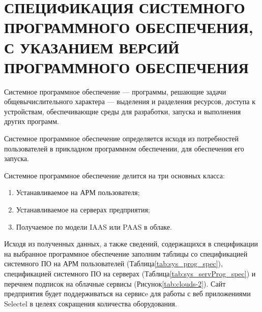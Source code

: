 \documentclass[14pt, a4paper]{extarticle}
\begin{document}
\section[СПЕЦИФИКАЦИЯ СИСТЕМНОГО ПРОГРАММНОГО \\ОБЕСПЕЧЕНИЯ, С УКАЗАНИЕМ ВЕРСИЙ ПРОГРАММНОГО ОБЕСПЕЧЕНИЯ]{СПЕЦИФИКАЦИЯ СИСТЕМНОГО \\ПРОГРАММНОГО ОБЕСПЕЧЕНИЯ, С УКАЗАНИЕМ ВЕРСИЙ ПРОГРАММНОГО ОБЕСПЕЧЕНИЯ}


Системное программное обеспечение — программы, решающие задачи общевычислительного характера — вы­де­ле­ния и разделения ресурсов, доступа к устройствам, обеспечивающие среды для разработки, запуска и выполнения других про­грамм.

Системное программное обеспечение определяется исходя из потребностей
пользователей в прикладном программном обеспечении, для обеспечения его запуска.


Системное программное обеспечение делится на три основных класса:
\begin{enumerate}
    \item Устанавливаемое на АРМ пользователя;
    \item Устанавливаемое на серверах предприятия;
    \item Получаемое по модели IAAS или PAAS в облаке. 
\end{enumerate}

    Исходя из полученных данных, а также сведений, содержащихся в спецификации на выбранное программное обеспечение заполним таблицы со спецификацией системного ПО на АРМ пользователей (Таблица\;\ref{tab:sys_prog_spec}), спецификацией системного ПО на серверах (Таблица\;\ref{tab:sys_servProg_spec}) и перечнем подписок на облачные сервисы (Рисунок\;\ref{tab:clouds-2}). Сайт предприятия будет поддерживаться на сервисe для работы с веб приложениями Selectel\cite{selectel} в целеях сокращения количества оборудования.
\end{document}
